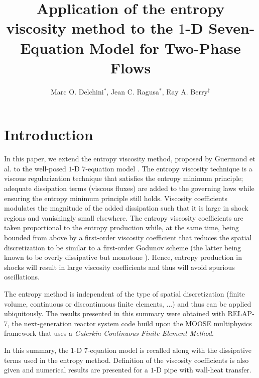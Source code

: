 \documentclass{anstrans}
\title{Application of the entropy viscosity method to the $1$-D Seven-Equation Model for Two-Phase Flows}
\author{Marc O. Delchini$^{*}$, Jean C. Ragusa$^{*}$, Ray A. Berry$^\dagger$}
\institute{
$^{*}$Department of Nuclear Engineering, Texas A\&M University, 
$^\dagger$Idaho National Laboratory
}
\begin{document}
\section{Introduction}
%
In this paper, we extend the entropy viscosity method, proposed by Guermond et al. \cite{jlg1, jlg2}
to the well-posed $1$-D 7-equation model \cite{DEM}. The entropy viscosity technique is a viscous regularization technique
that satisfies the entropy minimum principle; adequate dissipation terms (viscous fluxes)
are added to the governing laws while ensuring the entropy minimum principle still holds.
Viscosity coefficients modulates the magnitude of the added dissipation such that it is
large in shock regions and vanishingly small elsewhere. The entropy viscosity coefficients
are taken proportional to the entropy production while, at the same time, being bounded
from above by a first-order viscosity coefficient that reduces the spatial discretization
to be similar to a first-order Godunov scheme (the latter being known to be overly dissipative but
monotone \cite{toro}). Hence, entropy production in shocks will result in large viscosity  
coefficients and thus will avoid spurious oscillations. 

The entropy method is independent of the type of spatial discretization (finite volume,
continuous or discontinuous finite elements, ...) and thus can be applied ubiquitously. 
The results presented in this summary were obtained with RELAP-7, the next-generation 
reactor system code build upon the MOOSE multiphysics framework
\cite{moose} that uses a \emph{Galerkin Continuous Finite Element Method}.

In this summary, the $1$-D 7-equation model is recalled along with the dissipative terms used 
in the entropy method. Definition of the viscosity coefficients is also given and numerical 
results are presented for a $1$-D pipe with wall-heat transfer.
%
\end{document}
